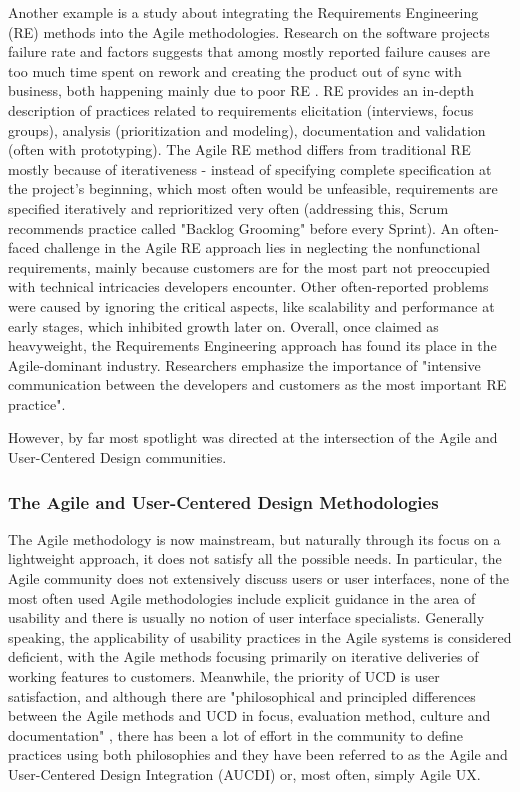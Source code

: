 \documentclass{article}
\begin{document}
Another example is a study about integrating the Requirements Engineering (RE) methods into the Agile methodologies. Research on the software projects failure rate and factors suggests that among mostly reported failure causes are too much time spent on rework and creating the product out of sync with business, both happening mainly due to poor RE \citep{arcidiacono2017comparative}. RE provides an in-depth description of practices related to requirements elicitation (interviews, focus groups), analysis (prioritization and modeling), documentation and validation (often with prototyping). The Agile RE method differs from traditional RE mostly because of iterativeness - instead of specifying complete specification at the project's beginning, which most often would be unfeasible, requirements are specified iteratively and reprioritized very often (addressing this, Scrum recommends practice called "Backlog Grooming" before every Sprint\citep{rubin2012essential}). An often-faced challenge in the Agile RE approach lies in neglecting the nonfunctional requirements, mainly because customers are for the most part not preoccupied with technical intricacies developers encounter. Other often-reported problems were caused by ignoring the critical aspects,  like scalability and performance at early stages, which inhibited growth later on. Overall, once claimed as heavyweight, the Requirements Engineering approach has found its place in the Agile-dominant industry. Researchers emphasize the importance of "intensive communication between the developers and customers as the most important RE practice". \citep[67]{cao2008agile} \citep{paetsch2003requirements} 

However, by far most spotlight was directed at the intersection of the Agile and User-Centered Design communities.

\subsubsection{The Agile and User-Centered Design Methodologies}
The Agile methodology is now mainstream, but naturally through its focus on a lightweight approach, it does not satisfy all the possible needs. In particular, the Agile community does not extensively discuss users or user interfaces, none of the most often used Agile methodologies include explicit guidance in the area of usability and there is usually no notion of user interface specialists. Generally speaking, the applicability of usability practices in the Agile systems is considered deficient, with the Agile methods focusing primarily on iterative deliveries of working features to customers. Meanwhile, the priority of UCD is user satisfaction, and although there are "philosophical and principled differences between the Agile methods and UCD in focus, evaluation method, culture and documentation" \citep[1]{salah2014systematic}, there has been a lot of effort in the community to define practices using both philosophies and they have been referred to as the Agile and User-Centered Design Integration (AUCDI) or, most often, simply Agile UX. \citep{salah2014systematic}\citep{jurca2014integrating}
\end{document}
